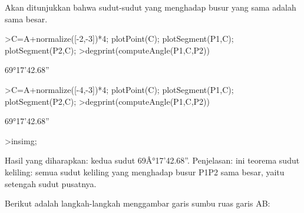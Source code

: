 \documentclass[a4paper,10pt]{article}
\begin{document}
\begin{eulernotebook}
\begin{eulercomment}
\begin{eulercomment}
\begin{eulercomment}
\begin{eulercomment}
\begin{eulercomment}
\begin{eulercomment}
\begin{euleroutput}
\end{euleroutput}
\begin{eulercomment}
Akan ditunjukkan bahwa sudut-sudut yang menghadap busur yang sama adalah sama besar.
\end{eulercomment}
\begin{eulerprompt}
>C=A+normalize([-2,-3])*4; plotPoint(C); plotSegment(P1,C); plotSegment(P2,C);
>degprint(computeAngle(P1,C,P2))
\end{eulerprompt}
\begin{euleroutput}
  69°17'42.68''
\end{euleroutput}
\begin{eulerprompt}
>C=A+normalize([-4,-3])*4; plotPoint(C); plotSegment(P1,C); plotSegment(P2,C);
>degprint(computeAngle(P1,C,P2))
\end{eulerprompt}
\begin{euleroutput}
  69°17'42.68''
\end{euleroutput}
\begin{eulerprompt}
>insimg;
\end{eulerprompt}
\begin{eulercomment}
Hasil yang diharapkan: kedua sudut 69Â°17'42.68''.
Penjelasan: ini teorema sudut keliling: semua sudut keliling yang menghadap busur P1P2 sama besar,
yaitu setengah sudut pusatnya.

\end{eulercomment}
\begin{eulercomment}
Berikut adalah langkah-langkah menggambar garis sumbu ruas garis AB:


\end{eulercomment}
\end{eulercomment}
\end{eulercomment}
\end{eulercomment}
\end{eulercomment}
\end{eulercomment}
\end{eulercomment}
\end{eulernotebook}
\end{document}
